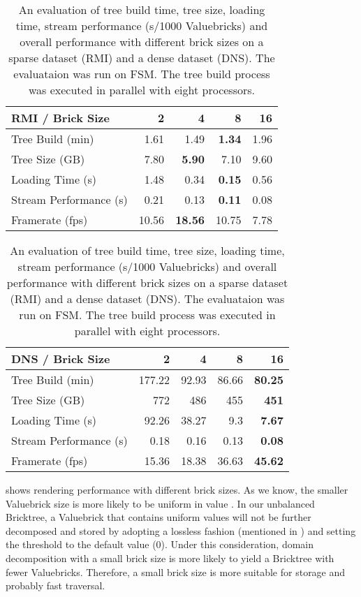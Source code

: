 \begin{table}[h!]
	\centering
	\begin{tabularx}{\linewidth}{l*{4}{r}}
		\toprule  
		\textbf{RMI / Brick Size}   & \textbf{2} & \textbf{4} & \textbf{8} & \textbf{16}  \\
		\hline
		Tree Build (min) & 1.61 & 1.49 & \textbf{1.34} & 1.96  \\
        Tree Size (GB) & 7.80 & \textbf{5.90} & 7.10 & 9.60  \\
        Loading Time (s) & 1.48 & 0.34 & \textbf{0.15} & 0.56  \\
        Stream Performance (s) & 0.21 & 0.13 & \textbf{0.11} & 0.08  \\
        Framerate (fps) & 10.56 & \textbf{18.56} & 10.75 & 7.78  \\
		\bottomrule
	\end{tabularx}
    \begin{tabularx}{\linewidth}{l*{4}{r}}
		\toprule  
		\textbf{DNS / Brick Size}   & \textbf{2} & \textbf{4} & \textbf{8} & \textbf{16}  \\
		\hline
		Tree Build (min) & 177.22 & 92.93 & 86.66 & \textbf{80.25}  \\
        Tree Size (GB) & 772 & 486 & 455 & \textbf{451}  \\
        Loading Time (s) & 92.26 & 38.27 & 9.3 & \textbf{7.67}  \\
        Stream Performance (s) & 0.18 & 0.16 & 0.13 & \textbf{0.08}  \\
        Framerate (fps) & 15.36 & 18.38 & 36.63 & \textbf{45.62}  \\
		\bottomrule
	\end{tabularx}
	\caption{An evaluation of tree build time, tree size, loading time, stream performance (s/1000 Valuebricks) and overall performance with different brick sizes on a sparse dataset (RMI) and a dense dataset (DNS). The evaluataion was run on FSM. The tree build process was executed in parallel with eight processors.}
	\vspace{-1em}
	\label{table:brick_size}
\end{table}

 shows rendering performance with different brick sizes.
As we know, the smaller Valuebrick size is more likely to be uniform in value 
\cite{fogal2013analysis}. In our unbalanced Bricktree, a Valuebrick that contains
uniform values will not be further decomposed and stored by adopting a lossless 
fashion (mentioned in ) and setting the threshold 
to the default value (0). Under this consideration, domain decomposition with a 
small brick size is more likely to yield a Bricktree with fewer Valuebricks. 
Therefore, a small brick size is more suitable for storage and probably fast traversal. 

